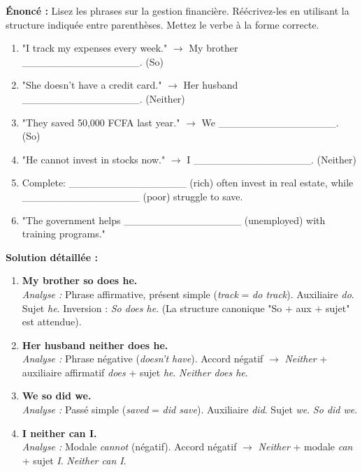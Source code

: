 \documentclass[11pt]{article}
\newcommand{\cle}[1]{{\popxbold\color{popdark}#1}}
\begin{document}
\begin{exoresolu}
    \textbf{Énoncé :} Lisez les phrases sur la gestion financière. Réécrivez-les en utilisant la structure indiquée entre parenthèses. Mettez le verbe à la forme correcte.
    \begin{enumerate}
        \item "I track my expenses every week." $\rightarrow$ My brother \_\_\_\_\_\_\_\_\_\_\_\_\_\_\_\_. (So)
        \item "She doesn't have a credit card." $\rightarrow$ Her husband \_\_\_\_\_\_\_\_\_\_\_\_\_\_\_\_. (Neither)
        \item "They saved 50,000 FCFA last year." $\rightarrow$ We \_\_\_\_\_\_\_\_\_\_\_\_\_\_\_\_. (So)
        \item "He cannot invest in stocks now." $\rightarrow$ I \_\_\_\_\_\_\_\_\_\_\_\_\_\_\_\_. (Neither)
        \item Complete: \_\_\_\_\_\_\_\_\_\_\_\_\_\_\_\_ (rich) often invest in real estate, while \_\_\_\_\_\_\_\_\_\_\_\_\_\_\_\_ (poor) struggle to save.
        \item "The government helps \_\_\_\_\_\_\_\_\_\_\_\_\_\_\_\_ (unemployed) with training programs."
    \end{enumerate}
    \tcblower
    \textbf{Solution détaillée :}
    \begin{enumerate}
        \item \textbf{My brother \cle{so does he}.} \\
              \textit{Analyse :} Phrase affirmative, présent simple (\emph{track} = \emph{do track}). Auxiliaire \emph{do}. Sujet \emph{he}. Inversion : \emph{So does he}. (La structure canonique "So + aux + sujet" est attendue).
        \item \textbf{Her husband \cle{neither does he}.} \\
              \textit{Analyse :} Phrase négative (\emph{doesn't have}). Accord négatif $\rightarrow$ \emph{Neither} + auxiliaire affirmatif \emph{does} + sujet \emph{he}. \emph{Neither does he}.
        \item \textbf{We \cle{so did we}.} \\
              \textit{Analyse :} Passé simple (\emph{saved} = \emph{did save}). Auxiliaire \emph{did}. Sujet \emph{we}. \emph{So did we}.
        \item \textbf{I \cle{neither can I}.} \\
              \textit{Analyse :} Modale \emph{cannot} (négatif). Accord négatif $\rightarrow$ \emph{Neither} + modale \emph{can} + sujet \emph{I}. \emph{Neither can I}.

\end{enumerate}
\end{exoresolu}
\end{document}

